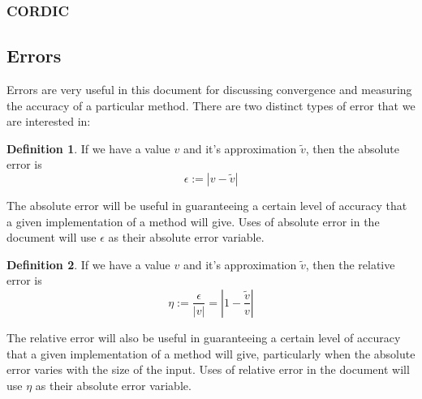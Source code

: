 


\subsubsection{CORDIC}
\label{SUBSUB_"CORDIC"}


\subsection{Errors}
\label{SUB_"Error Definitions"}
\theoremstyle{definition}
\newtheorem{Absolute Error}{Definition}[subsection]
\newtheorem{Relative Error}[Absolute Error]{Definition}
\newtheorem{Iteration Error}[Absolute Error]{Definition}

Errors are very useful in this document for discussing convergence and measuring the accuracy of a particular method. There are two distinct types of error that we are interested in:

\begin{Absolute Error}
\label{DEF_"Absolute Error"}
If we have a value \(v\) and it's approximation \(\tilde{v}\), then the absolute error is
\[ \epsilon := \left| v - \tilde{v} \right| \]
\end{Absolute Error}

The absolute error will be useful in guaranteeing a certain level of accuracy that a given implementation of a method will give. Uses of absolute error in the document will use \(\epsilon\) as their absolute error variable.

\begin{Relative Error}
\label{DEF_"Relative Error"}
If we have a value \(v\) and it's approximation \(\tilde{v}\), then the relative error is
\[ \eta := \frac{\epsilon}{\left| v \right|} = \left| 1 - \frac{\tilde{v}}{v} \right|\]
\end{Relative Error}

The relative error will also be useful in guaranteeing a certain level of accuracy that a given implementation of a method will give, particularly when the absolute error varies with the size of the input. Uses of relative error in the document will use \(\eta\) as their absolute error variable.\\

